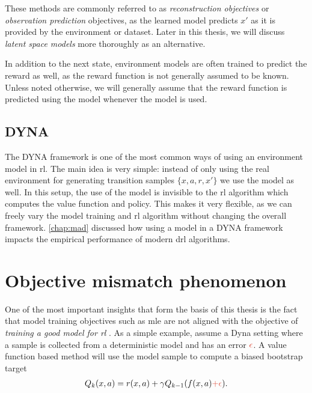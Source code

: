 These methods are commonly referred to as \emph{reconstruction objectives} or \emph{observation prediction} objectives, as the learned model predicts $x'$ as it is provided by the environment or dataset.
Later in this thesis, we will discuss \emph{latent space models} more thoroughly as an alternative.

In addition to the next state, environment models are often trained to predict the reward as well, as the reward function is not generally assumed to be known.
Unless noted otherwise, we will generally assume that the reward function is predicted using the model whenever the model is used.

\subsection{DYNA}

The DYNA framework \parencite{dyna} is one of the most common ways of using an environment model in \ac{rl}.
The main idea is very simple: instead of only using the real environment for generating transition samples $\{x,a,r,x'\}$ we use the model as well.
In this setup, the use of the model is invisible to the \ac{rl} algorithm which computes the value function and policy.
This makes it very flexible, as we can freely vary the model training and \ac{rl} algorithm without changing the overall framework.
\autoref{chap:mad} discussed how using a model in a DYNA framework impacts the empirical performance of modern \ac{drl} algorithms.


\section{Objective mismatch phenomenon}

\label{chap:background:objective}

One of the most important insights that form the basis of this thesis is the fact that model training objectives such as \ac{mle} are not aligned with the objective of \emph{training a good model for \ac{rl}} \parencite{schneider1997exploiting,kearns2002near,joseph2013reinforcement,vaml,talvitie2017self,lambert202objective}.
As a simple example, assume a Dyna setting where a sample is collected from a deterministic model and has an error ${\color{uoftred}\epsilon}$.
A value function based method will use the model sample to compute a biased bootstrap target
\begin{align}
    Q_k(\state,a) = r(\state,a) + \gamma Q_{k-1}(f(\state, a) {\color{uoftred} + \epsilon}).
\end{align}


